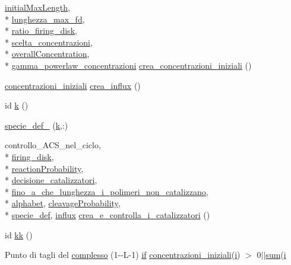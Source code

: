 \begin{DoxyCompactItemize}
\hyperlink{a00070_a4c7433c24b6426a15069cc5a93a5cbec}{initial\-Max\-Length}, \\*
\hyperlink{a00071_a7c974cc56015b6503e0619d32ebd4180}{lunghezza\-\_\-max\-\_\-fd}, \\*
\hyperlink{a00070_acd685f63a27f53fc049aff633634ddd6}{ratio\-\_\-firing\-\_\-disk}, \\*
\hyperlink{a00071_ac60b74a4c1b8bc23e64008ba1e0c41a8}{scelta\-\_\-concentrazioni}, \\*
\hyperlink{a00071_a59597688ed79473c0234f45eb9167574}{overall\-Concentration}, \\*
\hyperlink{a00071_a7cd0915d7542523abc226a8eecf67ecf}{gamma\-\_\-powerlaw\-\_\-concentrazioni} \hyperlink{a00068_a46820e2abe661887eb3c03ebcdd5aa14}{crea\-\_\-concentrazioni\-\_\-iniziali} ()
\item 
\hyperlink{a00061_a89801fa89eee3ba40f6610f290d6f6c3}{concentrazioni\-\_\-iniziali} \hyperlink{a00068_aedefd8a9b5b6248834cd58472da4be7d}{crea\-\_\-influx} ()
\item 
id \hyperlink{a00068_abf70355c2e58f64c6b18bda1b9bccfd7}{k} ()
\item 
\hyperlink{a00068_a206c02e53d19e1a7f6c297114dd5becb}{specie\-\_\-def\-\_} (\hyperlink{a00068_abf70355c2e58f64c6b18bda1b9bccfd7}{k},\-:)
\item 
controllo\-\_\-\-A\-C\-S\-\_\-nel\-\_\-ciclo, \\*
\hyperlink{a00061_acb72987b5000cf59c6f81c482e2ac8ac}{firing\-\_\-disk}, \\*
\hyperlink{a00071_a9101beaeb03fddb5c6a9e68442177543}{reaction\-Probability}, \\*
\hyperlink{a00071_a78948f867453293fcff0835b1bb05b8c}{decisione\-\_\-catalizzatori}, \\*
\hyperlink{a00071_ab6966d9ee620bc7376dc41a38352b948}{fino\-\_\-a\-\_\-che\-\_\-lunghezza\-\_\-i\-\_\-polimeri\-\_\-non\-\_\-catalizzano}, \\*
\hyperlink{a00071_abcbc32fc68e4323620d6171a17310212}{alphabet}, \hyperlink{a00071_a9d512df05ee559766d2b8f08e4704b04}{cleavage\-Probability}, \\*
\hyperlink{a00068_a85d979dc881d9a49537b0f43daa2b360}{specie\-\_\-def}, \hyperlink{a00065_a902e747aeec6b345d3a057099152f41f}{influx} \hyperlink{a00068_a369160212da6ddc667d7c8e245ed8b24}{crea\-\_\-e\-\_\-controlla\-\_\-i\-\_\-catalizzatori} ()
\item 
id \hyperlink{a00068_a262053c6a2b2b257b33309d12f8f7ba7}{kk} ()
\item 
Punto di tagli del \hyperlink{a00068_ad4d1a2311b23c0f860b99297ddc57214}{complesso} (1-\/-\/L-\/1) \hyperlink{a00030_a01d55766b8058903dd360b4bda71f9f5}{if} \hyperlink{a00061_a89801fa89eee3ba40f6610f290d6f6c3}{concentrazioni\-\_\-iniziali}(\hyperlink{a00071_ad3efca1ea6e3333daf30719ee0501862}{i}) $>$ 0$|$$|$\hyperlink{a00064_a59a869fb2b28d56dacd91c09e1dffc8d}{sum}(\hyperlink{a00071_ad3efca1ea6e3333daf30719ee0501862}{i}
$$
\end{DoxyCompactItemize}
